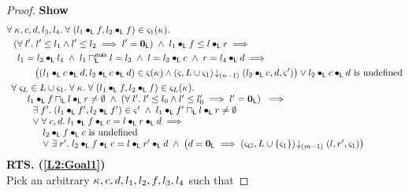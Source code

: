 \begin{lemma}[]
\begin{proof}
\noindent\textbf{Show}
\begin{align}
	&\for{\ca{}, c, d, l_3, l_4}\for{(l_1 \composeL f, l_2 \composeL f) \in \amod{1}(\ca{})} \nonumber\\
	&\hspace*{0.2cm} \left(\for{l'} l' \leq l_1 \land l' \leq l_2 \implies l' = \unitL\right)\;\land\; l_1 \composeL f \leq  l \composeL r \implies \nonumber\\
	&\hspace*{0.4cm}   l_1 = l_3 \composeL l_4 \;\land\; l_1 \maxMeetL l = l_3 \;\land\; l = l_3 \composeL c \;\land\; r = l_4 \composeL d\implies \nonumber\\
	&\hspace*{1cm} \left((l_1 \composeL c \composeL d, l_2 \composeL c \composeL d) \in \amod{}(\ca{}) \land
	\extendsAMUpto{\amod{}, L \cup \amod{1}}{(n-1)}{l_2 \composeL c}{d}{\amod{}'}\right) \lor l_2 \composeL c \composeL d \text{ is undefined}\label{L2:Goal1}\\
%
	&
  \begin{array}{l}
  	\for{\amod{L} \in L \cup \amod{1}} \for{\ca{}} \for{(l_1 \composeL f, l_2 \composeL f) \in \amod{L}(\ca{})} \\
  \hspace*{0.6cm} l_1 \composeL f \meetL l \composeL r \not= \emptyset \;\land\; \left(\for{l'} l' \leq l_0 \land l' \leq l'_0 \implies l' = \unitL\right)  \;\implies\\
  \hspace*{0.8cm}\exsts{f'} (l_1 \composeL f', l_2 \composeL f') \in \amod{}' \;\land\; l_1 \composeL f' \meetL l \composeL r \not= \emptyset\\
		\hspace*{0.8cm}\lor\;\for{c, d}  l_1 \composeL f \composeL c = l \composeL r \composeL d \implies\\
		\hspace*{1cm}
		\begin{array}{l l}
			l_2 \composeL f \composeL c \text{ is undefined}\\
			\lor\; \exsts{r'} l_2 \composeL f \composeL c = l \composeL r' \composeL d \;\land\; \left( d = \unitL \implies \extendsAMUpto{\amod{G}, L \cup \{\amod{1}\}}{(m-1)}{l}{r'}{\amod{1}}\right)
		\end{array}
	\end{array}\label{L2:Goal2}
% 
\end{align}
%
%
%
%
%
%
\textbf{RTS. (\ref{L2:Goal1})}\\
Pick an arbitrary $\kappa_{}, c, d, l_1, l_2, f, l_3, l_4$ such that 

\end{proof}
\end{lemma}
